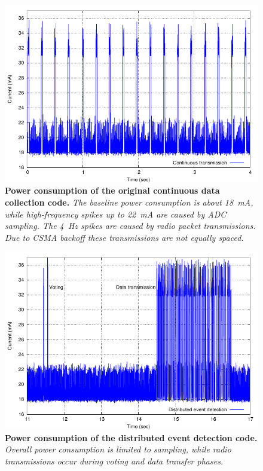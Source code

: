 \begin{figure}[t]
\begin{center}
\includegraphics[width=0.9\hsize]{./figures/DD/mdw/continuous.pdf}
\end{center}
\caption{\small {\bf Power consumption of the original 
continuous data collection code.} 
{\em The baseline power consumption is about 18~mA, while
high-frequency spikes up to 22~mA are caused by ADC sampling.
The 4~Hz spikes are caused by radio 
packet transmissions. Due to CSMA backoff these transmissions
are not equally spaced.}}
\label{fig-continuouspowerconsumption}
\end{figure}

\begin{figure}[t]
\begin{center}
\includegraphics[width=0.9\hsize]{./figures/DD/mdw/dd.pdf}
\end{center}
\caption{\small {\bf Power consumption of the distributed event 
detection code.} {\em Overall power consumption is limited to 
sampling, while radio transmissions occur during voting and
data transfer phases.}}
\label{fig-ddpowerconsumption}
\end{figure}


